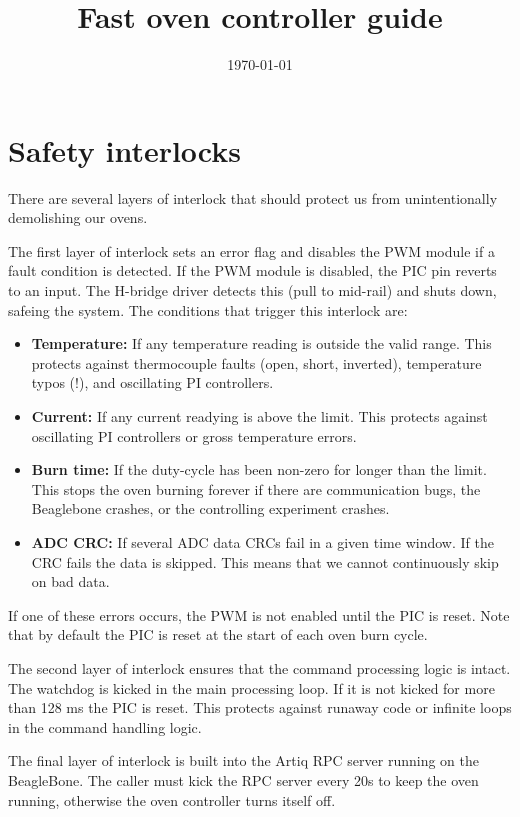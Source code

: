 \documentclass{article}
\begin{document}
\title{Fast oven controller guide}
\date{\today}

\maketitle


\section{Safety interlocks}
There are several layers of interlock that should protect us from unintentionally
demolishing our ovens.

The first layer of interlock sets an error flag and disables the PWM module if a
fault condition is detected. If the PWM module is disabled, the PIC pin reverts
to an input. The H-bridge driver detects this (pull to mid-rail) and shuts down,
safeing the system. The conditions that trigger this interlock are:
\begin{itemize}
\item \textbf{Temperature:}
If any temperature reading is outside the valid range. This protects
against thermocouple faults (open, short, inverted), temperature typos (!), and
oscillating PI controllers.
\item \textbf{Current:}
If any current readying is above the limit. This protects against
oscillating PI controllers or gross temperature errors.
\item \textbf{Burn time:}
If the duty-cycle has been non-zero for longer than the limit. This stops the
oven burning forever if there are communication bugs, the Beaglebone crashes, or
the controlling experiment crashes.
\item \textbf{ADC CRC:}
If several ADC data CRCs fail in a given time window. If the CRC fails the data
is skipped. This means that we cannot continuously skip on bad data.
\end{itemize}
If one of these errors occurs, the PWM is not enabled until the PIC is reset.
Note that by default the PIC is reset at the start of each oven burn cycle.

The second layer of interlock ensures that the command processing logic is
intact. The watchdog is kicked in the main processing loop. If it is not kicked 
for more than 128 ms the PIC is reset. This protects against runaway code or
infinite loops in the command handling logic.

The final layer of interlock is built into the Artiq RPC server running on the
BeagleBone. The caller must kick the RPC server every 20s to keep the oven running,
otherwise the oven controller turns itself off.
\end{document}
